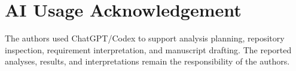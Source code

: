 \documentclass[sigconf,nonacm]{acmart}
\begin{document}
\section*{AI Usage Acknowledgement}

The authors used ChatGPT/Codex to support analysis planning, repository inspection, requirement interpretation, and manuscript drafting. The reported analyses, results, and interpretations remain the responsibility of the authors.



\end{document}
